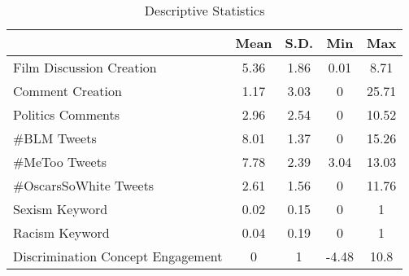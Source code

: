 \begin{table}[tb]
\begin{threeparttable}
\caption{Descriptive Statistics} 
\label{tab:DescStat}
\begingroup{}
\begin{tabular}{l *{4}{@{ }S[table-format=-1.2]@{ }}}
  \toprule
 & {Mean} & {S.D.} & {Min} & {Max} \\ 
  \midrule
Film Discussion Creation & 5.36 & 1.86 & 0.01 & 8.71 \\ 
  Comment Creation & 1.17 & 3.03 & 0 & 25.71 \\ 
  Politics Comments & 2.96 & 2.54 & 0 & 10.52 \\ 
  \#BLM Tweets & 8.01 & 1.37 & 0 & 15.26 \\ 
  \#MeToo Tweets & 7.78 & 2.39 & 3.04 & 13.03 \\ 
  \#OscarsSoWhite Tweets & 2.61 & 1.56 & 0 & 11.76 \\ 
  Sexism Keyword & 0.02 & 0.15 & 0 & 1 \\ 
  Racism Keyword & 0.04 & 0.19 & 0 & 1 \\ 
  Discrimination Concept Engagement & 0 & 1 & -4.48 & 10.8 \\ 
   \bottomrule
\end{tabular}
\endgroup
\end{threeparttable}
\end{table}

